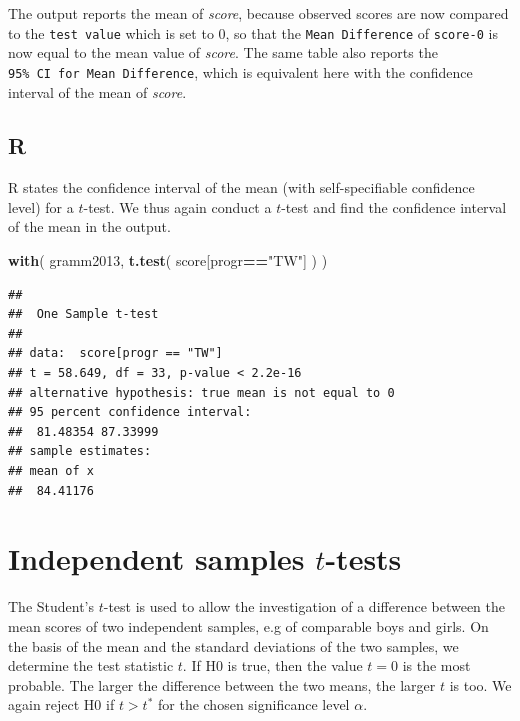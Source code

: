 \documentclass[
]{book}
\newenvironment{Shaded}{\begin{snugshade}}{\end{snugshade}}
\newcommand{\FunctionTok}[1]{\textcolor[rgb]{0.13,0.29,0.53}{\textbf{#1}}}
\newcommand{\NormalTok}[1]{#1}
\newcommand{\SpecialCharTok}[1]{\textcolor[rgb]{0.81,0.36,0.00}{\textbf{#1}}}
\newcommand{\StringTok}[1]{\textcolor[rgb]{0.31,0.60,0.02}{#1}}
\begin{document}
The output reports the mean of \emph{score}, because observed scores are now compared to the \texttt{test\ value} which is set to \(0\), so that the \texttt{Mean\ Difference} of \texttt{score-0} is now equal to the mean value of \emph{score}. The same table also reports the \texttt{95\%\ CI\ for\ Mean\ Difference}, which is equivalent here with the confidence interval of the mean of \emph{score}.

\subsection{R}\label{r-13}

R states the confidence interval of the mean (with self-specifiable
confidence level) for a \(t\)-test. We thus again conduct a \(t\)-test
and find the confidence interval of the mean in the
output.

\begin{Shaded}
\begin{Highlighting}[]
\FunctionTok{with}\NormalTok{( gramm2013, }\FunctionTok{t.test}\NormalTok{( score[progr}\SpecialCharTok{==}\StringTok{"TW"}\NormalTok{] ) )}
\end{Highlighting}
\end{Shaded}

\begin{verbatim}
## 
##  One Sample t-test
## 
## data:  score[progr == "TW"]
## t = 58.649, df = 33, p-value < 2.2e-16
## alternative hypothesis: true mean is not equal to 0
## 95 percent confidence interval:
##  81.48354 87.33999
## sample estimates:
## mean of x 
##  84.41176
\end{verbatim}

\section{\texorpdfstring{Independent samples \(t\)-tests}{Independent samples t-tests}}\label{sec:ttest-indep}

The Student's \(t\)-test is used to allow the investigation of a difference
between the mean scores of two independent samples, e.g of
comparable boys and girls. On the basis of the mean and the standard
deviations of the two samples, we determine the test statistic \(t\).
If H0 is true, then the value \(t=0\) is the most probable. The larger the difference
between the two means, the larger \(t\) is too. We again reject H0 if \(t>t^*\)
for the chosen significance level \(\alpha\).
\end{document}
